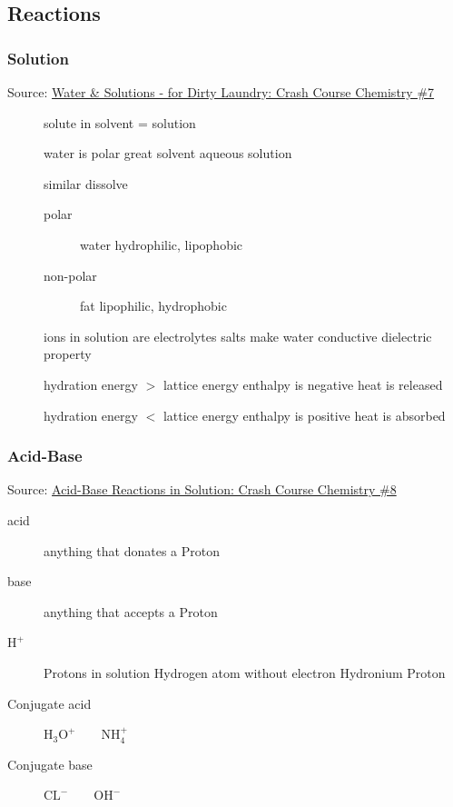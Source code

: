 \subsection{Reactions}

\subsubsection{Solution}
Source: \href{https://www.youtube.com/watch?v=AN4KifV12DA&list=PL8dPuuaLjXtPHzzYuWy6fYEaX9mQQ8oGr&index=8}{Water \& Solutions - for Dirty Laundry: Crash Course Chemistry \#7}

\begin{description}
    \item[] solute in solvent = solution 
    \item[] water is polar \arrow great solvent \arrow aqueous solution
    \item[] similar dissolve
    \begin{description}
        \item[polar] water \arrow hydrophilic, lipophobic
        \item[non-polar] fat \arrow lipophilic, hydrophobic
    \end{description}
    \item[] ions in solution are electrolytes \arrow salts make water conductive \arrow dielectric property
    \item[] hydration energy $>$ lattice energy \arrow enthalpy is negative \arrow heat is released
    \item[] hydration energy $<$ lattice energy \arrow enthalpy is positive \arrow heat is absorbed
\end{description}

\subsubsection{Acid-Base}
Source: \href{https://www.youtube.com/watch?v=ANi709MYnWg&list=PL8dPuuaLjXtPHzzYuWy6fYEaX9mQQ8oGr&index=9}{Acid-Base Reactions in Solution: Crash Course Chemistry \#8}

\begin{description}
    \item[acid] anything that donates a Proton
    \item[base] anything that accepts a Proton 
    \item[$\text{H}^+$] Protons in solution \arrow Hydrogen atom without electron \arrow Hydronium \arrow Proton
    \item[Conjugate acid] $\text{H}_3\text{O}^+ \qquad \text{N}\text{H}_4^+$ 
    \item[Conjugate base] $\text{C}\text{L}^- \qquad \text{O}\text{H}^-$ 
\end{description}

